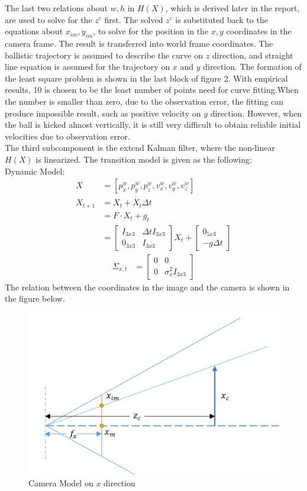 \documentclass[a4paper]{article}
\begin{document}
The last two relations about $w,h$ in $H(X)$, which is derived later in the report, are used to solve for the $z^c$ first. The solved $z^c$ is substituted back to the equations about $x_{im}, y_{im}$, to solve for the position in the $x,y$ coordinates in the camera frame. The result is transferred into world frame coordinates.  The ballistic trajectory is assumed to describe the curve on $z$ direction, and straight line equation is assumed for the trajectory on $x$ and $y$ direction. The formation of the least square problem is shown in the last block of figure 2. With empirical results, 10 is chosen to be the least number of points need for curve fitting.When the number is smaller than zero, due to the observation error, the fitting can produce impossible result, such as positive velocity on $y$ direction. However, when the ball is kicked almost vertically, it is still very difficult to obtain reliable initial velocities due to observation error. 
\\
The third subcomponent is the extend Kalman filter, where the  non-linear $H(X)$ is linearized. The transition model is given as the following: \\
Dynamic Model:
\begin{align*}
X & = [p_x^w, p_y^w, p_z^w, v_x^w, v_y^w, v_z^w] \\
X_{t+1} &= X_{t} + \dot{X_{t}}\Delta t\\
&= F \cdot X_t + g_t \\
&= \begin{bmatrix}
I_{3x3} & \Delta t I_{3x3} \\
0_{3x3} & I_{3x3}
\end{bmatrix} X_{t} + \begin{bmatrix}
0_{5x3} \\
-g\Delta t
\end{bmatrix}
\end{align*}
\begin{align*}
\Sigma_{x,t} &=
\begin{bmatrix}
0 & 0 \\
0 & \sigma_x^2 I_{3x3}
\end{bmatrix}
\end{align*}
The relation between the coordinates in the image and the camera is shown in the figure below. 
\begin{figure}[h]
\centering
\includegraphics[scale=0.7]{camModel.PNG}
\caption{Camera Model on $x$ direction}
\end{figure}
\end{document}
